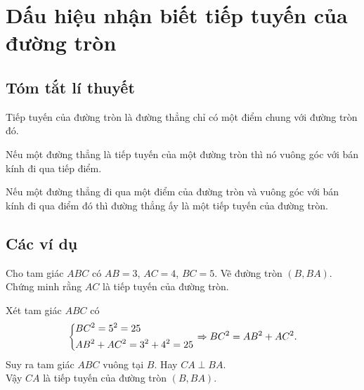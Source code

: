\section{Dấu hiệu nhận biết tiếp tuyến của đường tròn}
\subsection{Tóm tắt lí thuyết}
\begin{dn}
	Tiếp tuyến của đường tròn là đường thẳng chỉ có một điểm chung với đường tròn đó.
\end{dn}

\begin{dl}
	Nếu một đường thẳng là tiếp tuyến của một đường tròn thì nó vuông góc với bán kính đi qua tiếp điểm.
\end{dl}

\begin{dl}
\immini
{
	Nếu một đường thẳng đi qua một điểm của đường tròn và vuông góc với bán kính đi qua điểm đó thì đường thẳng ấy là một tiếp tuyến của đường tròn.
}
{
}
\end{dl}

\subsection{Các ví dụ}
\begin{vd}
Cho tam giác $ABC$ có $AB=3$, $AC=4$, $BC=5$. Vẽ đường tròn $(B,BA)$. Chứng minh rằng $AC$ là tiếp tuyến của đường tròn.
\loigiai
{
\immini
{
Xét tam giác $ABC$ có 
$$\left\{\begin{aligned}&BC^2=5^2=25\\&AB^2+AC^2=3^2+4^2=25\end{aligned}\right. \Rightarrow BC^2=AB^2+AC^2.$$
Suy ra tam giác $ABC$ vuông tại $B$. Hay $CA \perp BA$.\\
Vậy $CA$ là tiếp tuyến của đường tròn $(B,BA).$
}
{
}
}
\end{vd}

